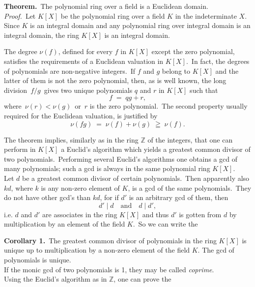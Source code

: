 \documentclass[12pt]{article}
\theoremstyle{definition}
\begin{document}
\textbf{Theorem.}\, The polynomial ring over a field is a Euclidean domain.\\

{\em Proof.}\, Let $K[X]$ be the polynomial ring over a field $K$ in the indeterminate $X$.\, Since $K$ is an integral domain and any polynomial ring over integral domain is an integral domain, the ring $K[X]$ is an integral domain.

The degree $\nu(f)$, defined for every $f$ in $K[X]$ except the zero polynomial, satisfies the requirements of a Euclidean valuation in $K[X]$.\, In fact, the degrees of polynomials are non-negative integers.\, If $f$ and $g$ belong to $K[X]$ and the latter of them is not the zero polynomial, then, as is well known, the long division\, $f/g$\, gives two unique polynomials $q$ and $r$ in $K[X]$ such that 
$$f \;=\; qg+r,$$
where\, $\nu(r) < \nu(g)$\, or\, $r$ is the zero polynomial.\, The second property usually required for the Euclidean valuation, is justified by
$$\nu(fg) \;=\; \nu(f)+\nu(g) \;\geqq\; \nu(f).$$


The theorem implies, similarly as in the ring $\mathbb{Z}$ of the integers, that one can perform in $K[X]$ a Euclid's algorithm which yields a greatest common divisor of two polynomials.\, Performing several  Euclid's algorithms one obtains a gcd of many polynomials; such a gcd is always in the same polynomial ring $K[X]$.\\

Let $d$ be a greatest common divisor of certain polynomials.\, Then apparently also $kd$, where $k$ is any non-zero element of $K$, is a gcd of the same polynomials.\, They do not have other gcd's than $kd$, for if $d'$ is an arbitrary gcd of them, then
$$d' \mid d \quad \mbox{and} \quad d \mid d',$$
i.e. $d$ and $d'$ are associates in the ring $K[X]$ and thus $d'$ is gotten from $d$ by multiplication by an element of the field $K$.\, So we can write the

\textbf{Corollary 1.}\, The greatest common divisor of polynomials in the ring $K[X]$ is unique up to multiplication by a non-zero element of the field $K$.  The  gcd of polynomials is unique.\\

If the monic gcd of two polynomials is 1, they may be called {\em coprime}.\\

Using the Euclid's algorithm as in $\mathbb{Z}$, one can prove the
\end{document}
